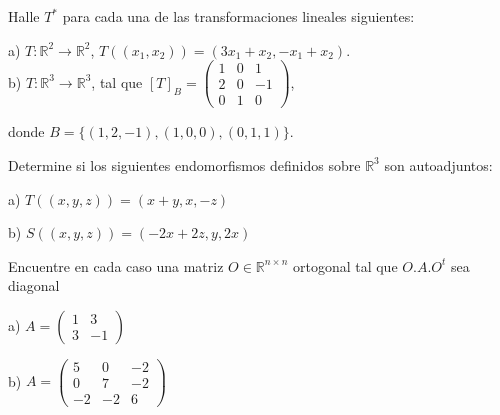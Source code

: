 {\begin{exercise}
\item

Halle $T^*$ para cada una de las transformaciones lineales siguientes:

a) $T:\mathbb{R}^2 \rightarrow \mathbb{R}^2$, $T((x_1,x_2))=(3x_1+x_2,-x_1+x_2)$.\\

b) $T:\mathbb{R}^3 \rightarrow \mathbb{R}^3$, tal que $\left[T \right]_B=\left(\begin{array}{ccc}1 & 0 & 1   \\ 2& 0 & -1
\\ 0  & 1 & 0                         
\end{array}
 \right)$, 
 
 donde $B=\{(1,2,-1),(1,0,0),(0,1,1)\}$.

 \bigskip
 
 

\end{exercise}

\begin{exercise}
\item
Determine si los siguientes endomorfismos definidos sobre $\mathbb{R}^3$ son autoadjuntos:

a) $T((x,y,z))=(x+y,x,-z)$

b) $S((x,y,z))=(-2x+2z,y,2x)$
\end{exercise}

\begin{exercise}
\item 

Encuentre en cada caso una matriz $O \in \mathbb{R}^{n \times n}$  ortogonal tal que $O.A.O^t$ sea diagonal

\bigskip

a) $A=\left(\begin{array}{cc}1 &  3   \\ 3 & -1
                       
\end{array}
 \right)$

\bigskip

b) $A=\left(\begin{array}{ccc}5 & 0 & -2   \\ 0 & 7 & -2
\\ -2  & -2 & 6                         
\end{array}
 \right)$


\end{exercise}}
